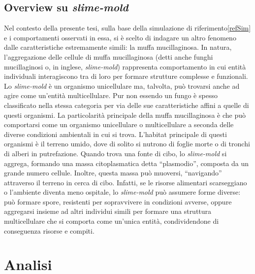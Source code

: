 \documentclass[12pt,a4paper,openright,twoside]{book}
\begin{document}
\section{Overview su \textit{slime-mold}}
Nel contesto della presente tesi, sulla base della simulazione di riferimento\ref{refSim} e i comportamenti osservati in essa, si è scelto di indagare un altro 
fenomeno dalle caratteristiche estremamente simili: la muffa mucillaginosa.
In natura, l'aggregazione delle cellule di muffa mucillaginosa (detti anche funghi mucillaginosi o, in inglese, \textit{slime-mold}) rappresenta
comportamento in cui entità individuali interagiscono tra di loro per formare strutture complesse e funzionali. 
Lo \textit{slime-mold} è un organismo unicellulare ma, talvolta, può trovarsi anche ad agire come un'entità multicellulare. 
Pur non essendo un fungo è spesso classificato nella stessa categoria per via delle sue caratteristiche affini a quelle di questi organismi.
La particolarità principale della muffa mucillaginosa è che può comportarsi come un organismo unicellulare o multicellulare a seconda delle diverse 
condizioni ambientali in cui si trova.
L'habitat principale di questi organismi è il terreno umido, dove di solito si nutrono di foglie morte o di tronchi di alberi in putrefazione.
Quando trova una fonte di cibo, lo \textit{slime-mold} si aggrega, formando una massa citoplasmatica detta ``plasmodio'', composta da un grande numero cellule. Inoltre,
questa massa può muoversi, ``navigando'' attraverso il terreno in cerca di cibo.
Infatti, se le risorse alimentari scarseggiano o l'ambiente diventa meno ospitale, lo \textit{slime-mold} può assumere forme diverse: può formare spore, 
resistenti per sopravvivere in condizioni avverse, oppure aggregarsi insieme ad altri individui simili per formare una struttura multicellulare
che si comporta come un'unica entità, condividendone di conseguenza risorse e compiti.

\chapter{Analisi}
\end{document}
